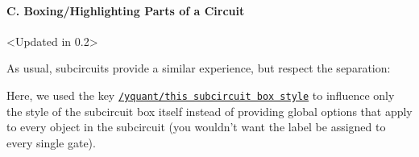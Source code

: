 \documentclass{scrartcl}
\makeatletter
\newenvironment{codeexample*}{%
   \VerbatimEnvironment%
   \let\FVB@VerbatimOut\minted@FVB@VerbatimOut
   \let\FVE@VerbatimOut\minted@FVE@VerbatimOut
   \minted@configlang{tex}%
   \minted@fvset
   \begin{VerbatimOut}[codes={\catcode`\^^I=12},firstline,lastline]{\minted@jobname.pyg}%
}{
   \end{VerbatimOut}%
   \minted@langlinenoson%
   \begin{adjustbox}{center}
       \minted@jobname.pyg %
   \end{adjustbox}\nopagebreak
   \minted@pygmentize{\minted@lang}%
   \minted@langlinenosoff%
   \par%
}
\def\style#1{\hyperref[style:#1]{\texttt{#1}}}
\makeatother
\begin{document}
            \paragraph{C. Boxing/Highlighting Parts of a Circuit}\leavevmode
               \begin{example}<Updated in 0.2>
                  \begin{codeexample*}
                  \end{codeexample*}
                  As usual, subcircuits provide a similar experience, but respect the separation:
                  \begin{codeexample*}
                  \end{codeexample*}
                  Here, we used the key \style{/yquant/this subcircuit box style} to influence only the style of the subcircuit box itself instead of providing global options that apply to every object in the subcircuit (you wouldn't want the label be assigned to every single gate).
               \end{example}
\end{document}
